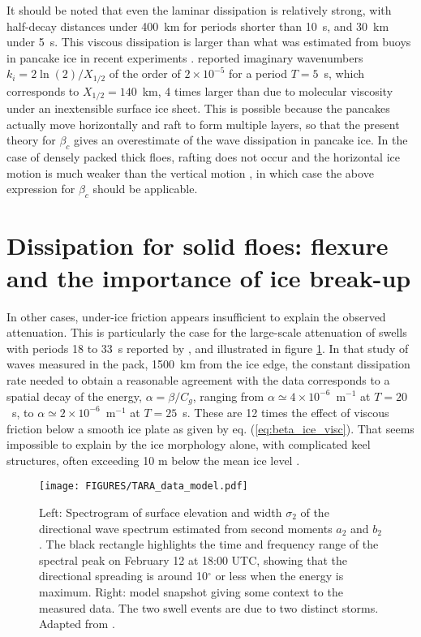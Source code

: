 It should be noted that even the laminar dissipation is relatively strong, with half-decay distances under 400~km for periods shorter than 10~s, and 30~km under 5~s. This viscous dissipation is larger than what was estimated from buoys in pancake ice in recent experiments \citep{Ardhuin&al.2018b}. \cite{Rogers&al.2016} reported imaginary wavenumbers $k_i = 2 \ln(2) / X_{1/2}$ of the order of $2 \times 10^{-5}$ for a period $T=5$~s, which corresponds to $X_{1/2} = 140$~km, 4 times larger than due to molecular viscosity under an inextensible surface ice sheet. This is possible because the pancakes actually move horizontally and raft to form multiple layers, so that the present theory for $\beta_c$ gives an overestimate of the wave dissipation in pancake ice. In the case of densely packed thick floes, rafting does not occur and the horizontal ice motion is much weaker than the vertical motion \citep{Fox&Haskell2001}, in which case the above expression for $\beta_c$ should be applicable.

\section{Dissipation for solid floes: flexure and the importance of ice break-up}
In other cases, under-ice friction appears insufficient to explain the observed attenuation. This is particularly the case for the large-scale attenuation of  swells with periods 18 to 33~s reported by \cite{Ardhuin&al.2016}, and illustrated in figure \ref{fig:TARA_data_model}. In that study of waves measured in the pack, 1500~km from the ice edge, the constant dissipation rate needed to obtain a reasonable agreement with the data corresponds to a spatial decay of the energy, $\alpha=\beta/C_g$, ranging from $\alpha \simeq 4 \times10^{-6}$~m$^{-1}$ at $T=20$~s, to $\alpha\simeq 2 \times 10^{-6}$~m$^{-1}$ at $T=25$~s.
These are 12 times the effect of viscous friction below a smooth ice plate as given by eq. (\ref{eq:beta_ice_visc}). 
That seems impossible to explain by the ice morphology alone, with complicated keel structures, often exceeding 10 m below the mean ice level \citep{Doble&al.2011}.

\begin{figure}[htb]
\centerline{\texttt{[image: FIGURES/TARA\_data\_model.pdf]}}
  \caption{Left: Spectrogram of surface elevation and width  $\sigma_2$ of the directional 
wave spectrum estimated from second moments $a_2$ and $b_2$.  The black rectangle highlights the time and frequency range of the spectral peak on February 12 at 18:00 UTC, showing that the directional spreading is around 10$^\circ$ or less when the energy is maximum. Right: model snapshot giving some context to the measured data. The two swell events are due to two distinct storms. Adapted from \cite{Ardhuin&al.2016}.} \label{fig:TARA_data_model}
\end{figure}


